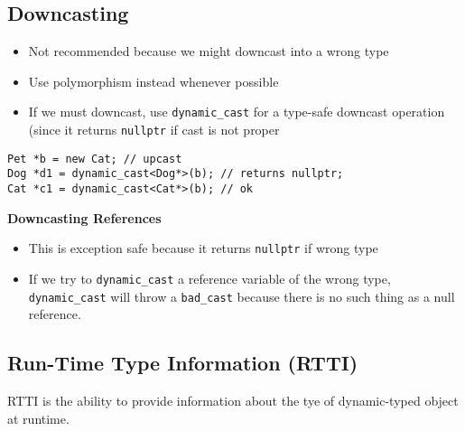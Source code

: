 \documentclass[12pt]{article}
\begin{document}
\subsection{Downcasting}
\begin{itemize}
    \item Not recommended because we might downcast into a wrong type
    \item Use polymorphism instead whenever possible
    \item If we must downcast, use \lstinline{dynamic_cast} for a type-safe downcast operation (since it returns \lstinline{nullptr} if cast is not proper
\end{itemize}
\begin{lstlisting}
Pet *b = new Cat; // upcast
Dog *d1 = dynamic_cast<Dog*>(b); // returns nullptr;
Cat *c1 = dynamic_cast<Cat*>(b); // ok
\end{lstlisting}

\textbf{Downcasting References}
\begin{itemize}
    \item This is exception safe because it returns \lstinline{nullptr} if wrong type
    \item If we try to \lstinline{dynamic_cast} a reference variable of the wrong type, \lstinline{dynamic_cast} will throw a \lstinline{bad_cast} because there is no such thing as a null reference.
\end{itemize}

\subsection{Run-Time Type Information (RTTI)}
RTTI is the ability to provide information about the tye of dynamic-typed object at runtime.
\end{document}
